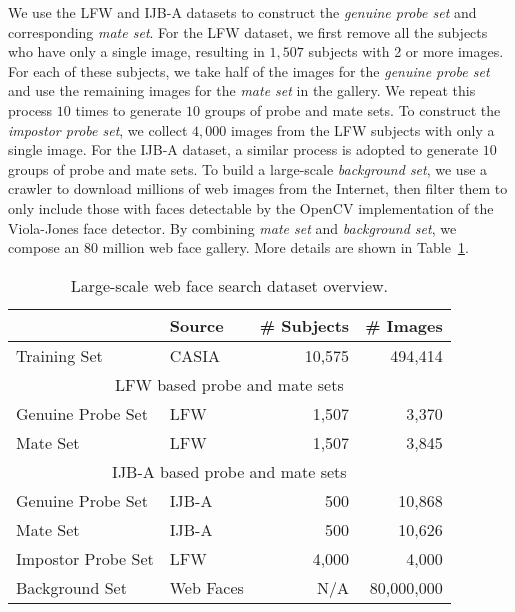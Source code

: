 \documentclass[10pt,journal,compsoc]{IEEEtran}
\begin{document}
We use the LFW and IJB-A datasets to construct the \emph{genuine probe set} and corresponding \emph{mate set}.
For the LFW dataset, we first remove all the subjects who have only a single image, resulting in $1,507$ subjects with 2 or more images. For each of these subjects, we take half of the images for the \emph{genuine probe set} and use the remaining images for the \emph{mate set} in the gallery. We repeat this process $10$ times to generate $10$ groups of probe and mate sets. To construct the \emph{impostor probe set}, we collect $4,000$ images from the LFW subjects with only a single image. For the IJB-A dataset, a similar process is adopted to generate $10$ groups of probe and mate sets. To build a large-scale \emph{background set}, we use a crawler to download millions of web images from the Internet, then filter them to only include those with faces detectable by the OpenCV implementation of the Viola-Jones face detector. By combining \emph{mate set} and \emph{background set}, we compose an $80$ million web face gallery. More details are shown in Table~\ref{tab:web_ret}.
\begin{table}[htbp]
\centering
\caption{Large-scale web face search dataset overview.}\label{tab:web_ret}
    \begin{tabular}{llrr}
    \toprule
                       & Source                   & \# Subjects  & \# Images  \\ \midrule
    Training Set       & CASIA~\cite{DB:CASIA}    & 10,575       & 494,414           \\ \midrule
    \multicolumn{4}{c}{LFW based probe and mate sets} \\
    Genuine Probe Set  & LFW~\cite{DB:LFWTech}    & 1,507        & 3,370             \\
    Mate Set           & LFW~\cite{DB:LFWTech}    & 1,507        & 3,845             \\ \midrule
    \multicolumn{4}{c}{IJB-A based probe and mate sets} \\
    Genuine Probe Set  & IJB-A~\cite{DB:LFWTech}  & 500          & 10,868            \\
    Mate Set           & IJB-A~\cite{DB:LFWTech}  & 500          & 10,626            \\ \midrule
    Impostor Probe Set & LFW~\cite{DB:LFWTech}    & 4,000        & 4,000             \\
    Background Set     & Web Faces                & N/A           & 80,000,000        \\
    \bottomrule
    \end{tabular}
\end{table}
\end{document}
